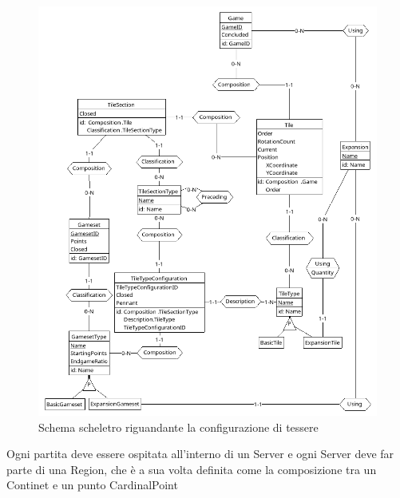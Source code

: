\begin{figure}[hb]
    \centering\includegraphics[scale=0.24]{images/Progettazione/Concettuale/Scheletro3.png}
    \caption{Schema scheletro riguandante la configurazione di tessere}
\end{figure}
Ogni partita deve essere ospitata all'interno di un Server e ogni Server deve far parte di una Region, che è a sua volta definita come la composizione tra un Continet e un punto CardinalPoint
